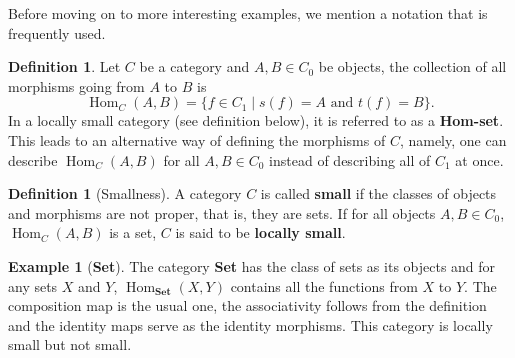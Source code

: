 \documentclass{article}
\theoremstyle{definition}
\newtheorem{defn}[thm]{Definition}
\newtheorem{exmp}[thm]{Example}
\theoremstyle{remark}
\DeclareMathOperator{\Hom}{Hom}
\begin{document}
Before moving on to more interesting examples, we mention a notation that is frequently used.
\begin{defn}
	Let $C$ be a category and $A,B \in C_0$ be objects, the collection of all morphisms going from $A$ to $B$ is 
	\[\Hom_{C}(A,B) = \{f \in C_1 \mid s(f) = A \text{ and } t(f) = B\}.\]
	In a locally small category (see definition below), it is referred to as a \textbf{Hom-set}. This leads to an alternative way of defining the morphisms of $C$, namely, one can describe $\Hom_C(A,B)$ for all $A, B \in C_0$ instead of describing all of $C_1$ at once. 
\end{defn}
\begin{defn}[Smallness]
	A category $C$ is called \textbf{small} if the classes of objects and morphisms are not proper, that is, they are sets. If for all objects $A,B \in C_0$, $\Hom_C(A,B)$ is a set, $C$ is said to be \textbf{locally small}. 
\end{defn}
\begin{exmp}[\textbf{\textbf{Set}}]
	The category \textbf{Set} has the class of sets as its objects and for any sets $X$ and $Y$, $\Hom_{\textbf{Set}}(X,Y)$ contains all the functions from $X$ to $Y$. The composition map is the usual one, the associativity follows from the definition and the identity maps serve as the identity morphisms. This category is locally small but not small.
\end{exmp}
\end{document}
